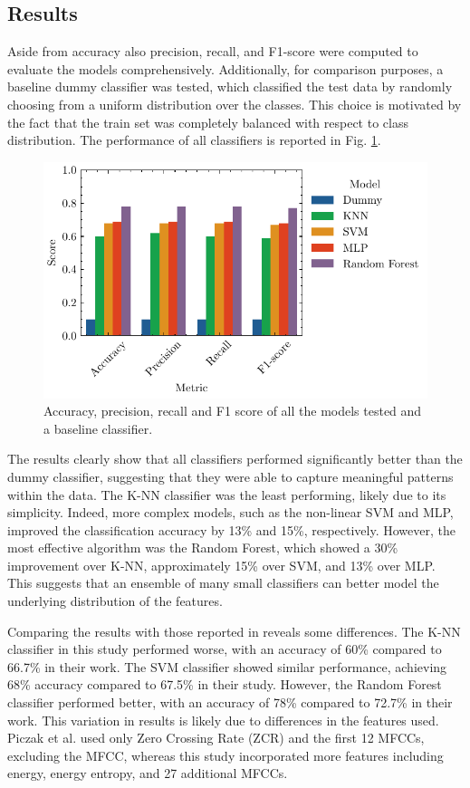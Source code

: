 \documentclass[journal]{IEEEtran}
\begin{document}
\subsection{Results}
Aside from accuracy also precision, recall, and F1-score were computed to evaluate the models comprehensively. Additionally, for comparison purposes, a baseline dummy classifier was tested, which classified the test data by randomly choosing from a uniform distribution over the classes. This choice is motivated by the fact that the train set was completely balanced with respect to class distribution.
The performance of all classifiers is reported in Fig. \ref{fig:model_comparison}.
\begin{figure}[h]
    \centering
    \includegraphics[width=\linewidth]{model_comparison.pdf}
    \caption{Accuracy, precision, recall and F1 score of all the models tested and a baseline classifier.}
    \label{fig:model_comparison}
\end{figure}

The results clearly show that all classifiers performed significantly better than the dummy classifier, suggesting that they were able to capture meaningful patterns within the data. The K-NN classifier was the least performing, likely due to its simplicity. Indeed, more complex models, such as the non-linear SVM and MLP, improved the classification accuracy by 13\% and 15\%, respectively. However, the most effective algorithm was the Random Forest, which showed a 30\% improvement over K-NN, approximately 15\% over SVM, and 13\% over MLP. This suggests that an ensemble of many small classifiers can better model the underlying distribution of the features.

Comparing the results with those reported in \cite{esc-50} reveals some differences. The K-NN classifier in this study performed worse, with an accuracy of 60\% compared to 66.7\% in their work. The SVM classifier showed similar performance, achieving 68\% accuracy compared to 67.5\% in their study. However, the Random Forest classifier performed better, with an accuracy of 78\% compared to 72.7\% in their work. This variation in results is likely due to differences in the features used. Piczak et al. used only Zero Crossing Rate (ZCR) and the first 12 MFCCs, excluding the  MFCC, whereas this study incorporated more features including energy, energy entropy, and 27 additional MFCCs.
\end{document}
